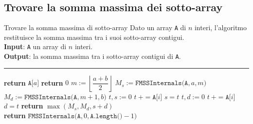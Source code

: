 \documentclass[a4paper, 12pt]{report}
\begin{document}
    \subsection{Trovare la somma massima dei sotto-array}

    \begin{framedalgo}[breakable]{Trovare la somma massima di sotto-array}
        Dato un array \texttt{A} di $n$ interi, l'algoritmo restituisce la somma massima tra i suoi sotto-array contigui.\\
        \textbf{Input}: \texttt{A} un array di $n$ interi.\\
        \textbf{Output}: la somma massima tra i sotto-array contigui di \texttt{A}.

        \hrule
        \begin{algorithmic}[1]
                        \State \textbf{return} $\texttt{A[}a\texttt{]}$
                    \Else
                        \State \textbf{return} $0$
                    \EndIf
                \Else
                    \State $m := \left \lfloor \dfrac{a + b}{2} \right \rfloor$
                    \State $M_s := \texttt{FMSSInternals(A}, a, m\texttt{)}$
                    \State $M_d := \texttt{FMSSInternals(A}, m +1, b\texttt{)}$
                    \State $t, s := 0$
                     
                        \State $t \ += \texttt{A[}i\texttt{]}$
                            \State $s = t$
                        \EndIf
                    \EndFor
                    \State $t, d := 0$
                     
                        \State $t \ += \texttt{A[}i\texttt{]}$
                            \State $d = t$
                        \EndIf
                    \EndFor
                    \State \textbf{return} $\max(M_s, M_d, s + d)$
                \EndIf
            \EndFunction
            \\
                \State \textbf{return} $\texttt{FMSSInternals(A}, 0, \texttt{A.length()} - 1 \texttt{)}$ 
            \EndFunction
        \end{algorithmic}
    \end{framedalgo}
\end{document}
